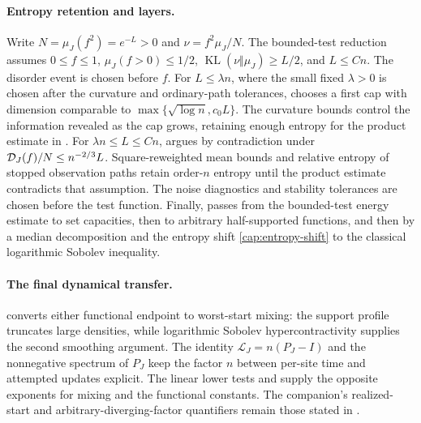 \paragraph{Entropy retention and layers.}
Write $N=\mu_J(f^2)=e^{-L}>0$ and $\nu=f^2\mu_J/N$. The bounded-test
reduction assumes $0\le f\le1$, $\mu_J(f>0)\le1/2$,
$\operatorname{KL}(\nu\Vert\mu_J)\ge L/2$, and $L\le Cn$. The disorder
event is chosen before $f$. For $L\le\lambda n$, where the small fixed
$\lambda>0$ is chosen after the curvature and ordinary-path tolerances,
 chooses a first cap with dimension comparable
to $\max\{\sqrt{\log n},c_0L\}$. The curvature bounds control the
information revealed as the cap grows, retaining enough entropy for the
product estimate in . For
$\lambda n\le L\le Cn$,  argues by contradiction
under $\mathcal D_J(f)/N\le n^{-2/3}L$. Square-reweighted mean bounds and relative
entropy of stopped observation paths retain order-$n$ entropy until the
product estimate contradicts that assumption. The noise diagnostics and
stability tolerances are chosen before the test function. Finally,
 passes from the bounded-test energy estimate to
set capacities, then to arbitrary half-supported functions, and then by
a median decomposition and the entropy shift \eqref{cap:entropy-shift}
to the classical logarithmic Sobolev inequality.

\paragraph{The final dynamical transfer.}
 converts either functional endpoint to worst-start
mixing: the support profile truncates large densities, while logarithmic
Sobolev hypercontractivity supplies the second smoothing argument. The
identity $\mathcal L_J=n(P_J-I)$ and the nonnegative spectrum of $P_J$
keep the factor $n$ between per-site time and attempted updates explicit.
The linear lower tests and  supply the
opposite exponents for mixing and the functional constants. The
companion's realized-start and arbitrary-diverging-factor quantifiers
remain those stated in .
